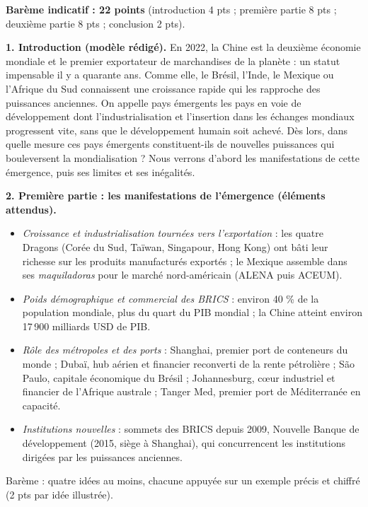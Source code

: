\documentclass[11pt]{article}
\newcommand{\cle}[1]{{\popxbold\color{popdark}#1}}
\begin{document}
\begin{corrige}
\textbf{Barème indicatif : 22 points} (introduction 4 pts ; première partie 8 pts ; deuxième partie 8 pts ; conclusion 2 pts).

\textbf{1. Introduction (modèle rédigé).} En 2022, la Chine est la deuxième économie mondiale et le premier exportateur de marchandises de la planète : un statut impensable il y a quarante ans. Comme elle, le Brésil, l'Inde, le Mexique ou l'Afrique du Sud connaissent une croissance rapide qui les rapproche des puissances anciennes. On appelle \cle{pays émergents} les pays en voie de développement dont l'industrialisation et l'insertion dans les échanges mondiaux progressent vite, sans que le développement humain soit achevé. Dès lors, dans quelle mesure ces pays émergents constituent-ils de nouvelles puissances qui bouleversent la mondialisation ? Nous verrons d'abord les manifestations de cette émergence, puis ses limites et ses inégalités.

\textbf{2. Première partie : les manifestations de l'émergence (éléments attendus).}
\begin{itemize}
\item \emph{Croissance et industrialisation tournées vers l'exportation} : les quatre Dragons (Corée du Sud, Taïwan, Singapour, Hong Kong) ont bâti leur richesse sur les produits manufacturés exportés ; le Mexique assemble dans ses \emph{maquiladoras} pour le marché nord-américain (ALENA puis ACEUM).
\item \emph{Poids démographique et commercial des BRICS} : environ 40 \% de la population mondiale, plus du quart du PIB mondial ; la Chine atteint environ 17\,900 milliards USD de PIB.
\item \emph{Rôle des métropoles et des ports} : Shanghai, premier port de conteneurs du monde ; Dubaï, hub aérien et financier reconverti de la rente pétrolière ; São Paulo, capitale économique du Brésil ; Johannesburg, cœur industriel et financier de l'Afrique australe ; Tanger Med, premier port de Méditerranée en capacité.
\item \emph{Institutions nouvelles} : sommets des BRICS depuis 2009, Nouvelle Banque de développement (2015, siège à Shanghai), qui concurrencent les institutions dirigées par les puissances anciennes.
\end{itemize}
Barème : quatre idées au moins, chacune appuyée sur un exemple précis et chiffré (2 pts par idée illustrée).


\end{corrige}
\end{document}
